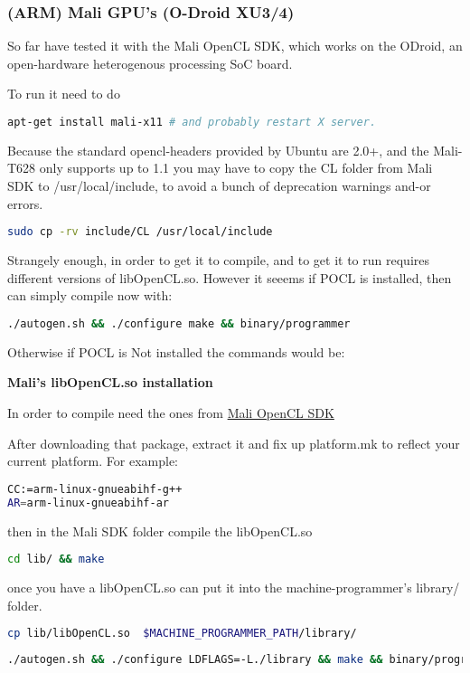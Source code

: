 \documentclass[12pt]{report}
\begin{document}
\subsubsection{(ARM) Mali GPU's (O-Droid XU3/4)}

So far have tested it with the Mali OpenCL SDK, which works on the ODroid, an
open-hardware heterogenous processing SoC board.


To run it need to do
\begin{lstlisting}[language=bash]
apt-get install mali-x11 # and probably restart X server.
\end{lstlisting}


Because the standard opencl-headers provided by Ubuntu are 2.0+, and the
Mali-T628 only supports up to 1.1 you may have to copy the CL folder 
from Mali SDK to /usr/local/include, to avoid a bunch of deprecation
warnings and-or errors.
\begin{lstlisting}[language=bash]
sudo cp -rv include/CL /usr/local/include
\end{lstlisting}

Strangely enough, in order to get it to compile, and to get it to run requires
different versions of libOpenCL.so. However it seeems if POCL is installed, then
can simply compile now with:

\begin{lstlisting}[language=bash]
./autogen.sh && ./configure make && binary/programmer
\end{lstlisting}

Otherwise if POCL is Not installed the commands would be:

\textbf{Mali's libOpenCL.so installation}

In order to compile need the ones from
\href{https://developer.arm.com/products/software/mali-sdks/mali-opencl-sdk/downloads}
{Mali OpenCL SDK}

After downloading that package, extract it and fix up platform.mk to reflect
your current platform. For example:
\begin{lstlisting}[language=bash]
CC:=arm-linux-gnueabihf-g++
AR=arm-linux-gnueabihf-ar
\end{lstlisting}


then in the Mali SDK folder compile the libOpenCL.so
\begin{lstlisting}[language=bash]
cd lib/ && make
\end{lstlisting}
once you have a libOpenCL.so can put it into the machine-programmer's 
library/ folder.
\begin{lstlisting}[language=bash]
cp lib/libOpenCL.so  $MACHINE_PROGRAMMER_PATH/library/
\end{lstlisting}
\begin{lstlisting}[language=bash]
./autogen.sh && ./configure LDFLAGS=-L./library && make && binary/programmer
\end{lstlisting}
\end{document}
